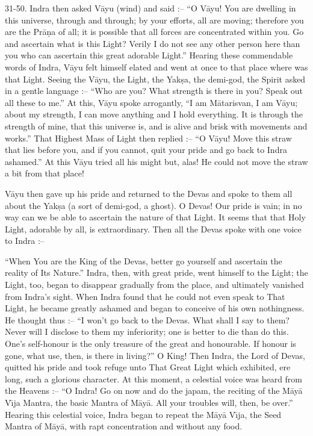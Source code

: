 31-50. Indra then asked V\=ayu (wind) and said :-- ``O V\=ayu! You are dwelling in this universe, through and through; by your efforts, all are moving; therefore you are the Pr\=a\d{n}a of all; it is possible that all forces are concentrated within you. Go and ascertain what is this Light? Verily I do not see any other person here than you who can ascertain this great adorable Light.'' Hearing these commendable words of Indra, V\=ayu felt himself elated and went at once to that place where was that Light. Seeing the V\=ayu, the Light, the Yak\d{s}a, the demi-god, the Spirit asked in a gentle language :-- ``Who are you? What strength is there in you? Speak out all these to me.'' At this, V\=ayu spoke arrogantly, ``I am M\=atarisvan, I am V\=ayu; about my strength, I can move anything and I hold everything. It is through the strength of mine, that this universe is, and is alive and brisk with movements and works.'' That Highest Mass of Light then replied :-- ``O V\=ayu! Move this straw that lies before you, and if you cannot, quit your pride and go back to Indra ashamed.'' At this V\=ayu tried all his might but, alas! He could not move the straw a bit from that place!

V\=ayu then gave up his pride and returned to the Devas and spoke to them all about the Yak\d{s}a (a sort of demi-god, a ghost). O Devas! Our pride is vain; in no way can we be able to ascertain the nature of that Light. It seems that that Holy Light, adorable by all, is extraordinary. Then all the Devas spoke with one voice to Indra :--

``When You are the King of the Devas, better go yourself and ascertain the reality of Its Nature.'' Indra, then, with great pride, went himself to the Light; the Light, too, began to disappear gradually from the place, and ultimately vanished from Indra's sight. When Indra found that he could not even speak to That Light, he became greatly ashamed and began to conceive of his own nothingness. He thought thus :-- ``I won't go back to the Devas. What shall I say to them? Never will I disclose to them my inferiority; one is better to die than do this. One's self-honour is the only treasure of the great and honourable. If honour is gone, what use, then, is there in living?'' O King! Then Indra, the Lord of Devas, quitted his pride and took refuge unto That Great Light which exhibited, ere long, such a glorious character. At this moment, a celestial voice was heard from the Heavens :-- ``O Indra! Go on now and do the japam, the reciting of the M\=ay\=a V\={\i}ja Mantra, the basic Mantra of M\=ay\=a. All your troubles will, then, be over.'' Hearing this celestial voice, Indra began to repeat the M\=ay\=a V\={\i}ja, the Seed Mantra of M\=ay\=a, with rapt concentration and without any food.

